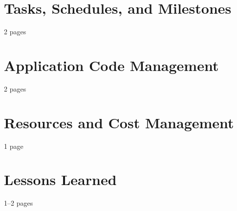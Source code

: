\begin{chapterpage}
\end{chapterpage}
\section{Tasks, Schedules, and Milestones}
2 pages
\section{Application Code Management}
2 pages
\section{Resources and Cost Management}
1 page
\section{Lessons Learned}
1--2 pages
